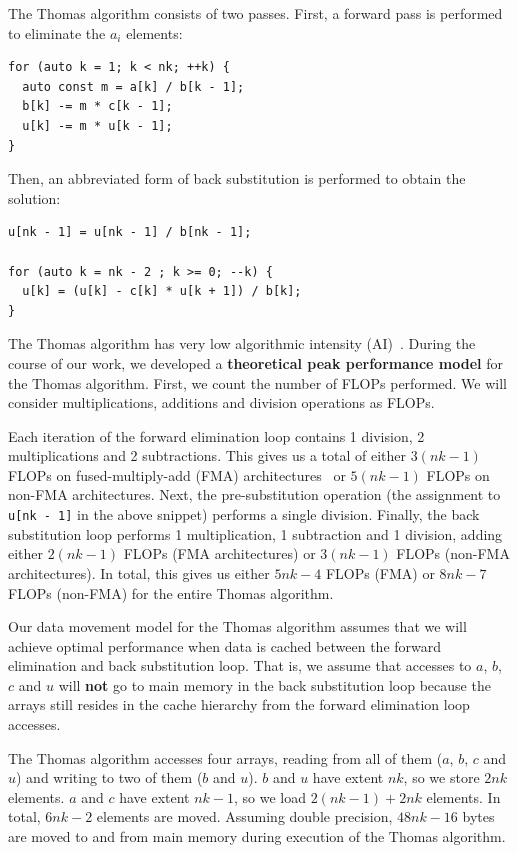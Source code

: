 \documentclass{sig-alternate}
\begin{document}
The Thomas algorithm consists of two passes.  First, a forward pass is
  performed to eliminate the \(a_i\) elements:
\begin{lstlisting}
for (auto k = 1; k < nk; ++k) {
  auto const m = a[k] / b[k - 1];
  b[k] -= m * c[k - 1];
  u[k] -= m * u[k - 1];
} 
\end{lstlisting}
Then, an abbreviated form of back substitution is performed to obtain the
  solution:
\begin{lstlisting}
u[nk - 1] = u[nk - 1] / b[nk - 1];

for (auto k = nk - 2 ; k >= 0; --k) {
  u[k] = (u[k] - c[k] * u[k + 1]) / b[k];
} 
\end{lstlisting}

The Thomas algorithm has very low algorithmic intensity (AI)~\cite{roofline}.
During the course of our work, we developed a \textbf{theoretical peak
  performance model} for the Thomas algorithm.
First, we count the number of FLOPs performed.
We will consider multiplications, additions and division operations as FLOPs.

Each iteration of the forward elimination loop contains 1 division, 2
  multiplications and 2 subtractions.
This gives us a total of either \(3(nk-1)\) FLOPs on fused-multiply-add (FMA)
  architectures~\cite{intel_sw_dev_manual_2c} or 
  \(5(nk-1)\) FLOPs on non-FMA architectures.
Next, the pre-substitution operation (the assignment to \lstinline{u[nk - 1]}
  in the above snippet) performs a single division.
Finally, the back substitution loop performs 1 multiplication, 1
  subtraction and 1 division, adding either \(2(nk-1)\) FLOPs (FMA architectures)
  or \(3(nk-1)\) FLOPs (non-FMA architectures).
In total, this gives us either \(5nk-4\) FLOPs (FMA) or \(8nk-7\) FLOPs
  (non-FMA) for the entire Thomas algorithm.

Our data movement model for the Thomas algorithm assumes that we will achieve
  optimal performance when data is cached between the forward elimination and
  back substitution loop.
That is, we assume that accesses to \(a\), \(b\), \(c\) and \(u\) will
  \textbf{not} go to main memory in the back substitution loop because the
  arrays still resides in the cache hierarchy from the forward elimination loop
  accesses.

The Thomas algorithm accesses four arrays, reading from all of them (\(a\),
  \(b\), \(c\) and \(u\)) and writing to two of them (\(b\) and \(u\)).
\(b\) and \(u\) have extent \(nk\), so we store \(2nk\) elements.
\(a\) and \(c\) have extent \(nk-1\), so we load \(2(nk-1)+2nk\) elements.
In total, \(6nk-2\) elements are moved.
Assuming double precision, \(48nk-16\) bytes are moved to and from main memory
  during execution of the Thomas algorithm.
\end{document}
